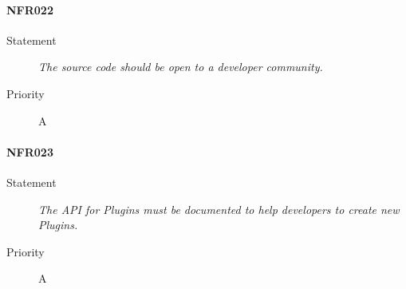 \paragraph{NFR022}
\begin{description}
  \item [Statement] \textit{The source code should be open to a developer community.}
  \item [Priority] A
\end{description}

\paragraph{NFR023}
\begin{description}
  \item [Statement] \textit{The \gls{API} for \gls{Plugins} must be documented to help developers to create new \gls{Plugins}.}
  \item [Priority] A
\end{description}

